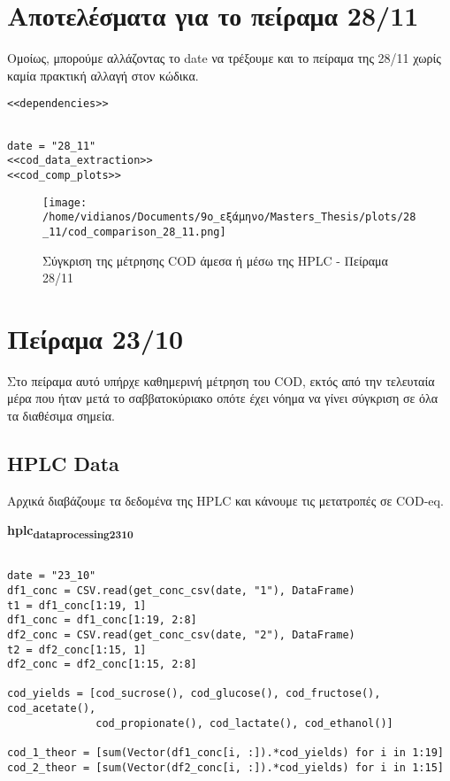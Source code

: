 \documentclass[11pt]{article}
\begin{document}
\section{Αποτελέσματα για το πείραμα 28/11}
\label{sec:org9fa10d9}
Ομοίως, μπορούμε αλλάζοντας το date να τρέξουμε και το πείραμα της 28/11 χωρίς καμία πρακτική αλλαγή στον κώδικα.

\begin{verbatim}
<<dependencies>>
\end{verbatim}

\begin{verbatim}

date = "28_11"
<<cod_data_extraction>>
<<cod_comp_plots>>

\end{verbatim}

\begin{figure}[htbp]
\centering
\texttt{[image: /home/vidianos/Documents/9o\_εξάμηνο/Masters\_Thesis/plots/28\_11/cod\_comparison\_28\_11.png]}
\caption{Σύγκριση της μέτρησης COD άμεσα ή μέσω της HPLC - Πείραμα 28/11}
\end{figure}

\section{Πείραμα 23/10}
\label{sec:orge1a3844}
Στο πείραμα αυτό υπήρχε καθημερινή μέτρηση του COD, εκτός από την τελευταία μέρα που ήταν μετά το σαββατοκύριακο οπότε έχει νόημα να γίνει σύγκριση σε όλα τα διαθέσιμα σημεία.

\subsection{HPLC Data}
\label{sec:orgcd6d45e}
Αρχικά διαβάζουμε τα δεδομένα της HPLC και κάνουμε τις μετατροπές σε COD-eq.

\textbf{hplc\textsubscript{data}\textsubscript{processing}\textsubscript{23}\textsubscript{10}}
\begin{verbatim}

date = "23_10"
df1_conc = CSV.read(get_conc_csv(date, "1"), DataFrame)
t1 = df1_conc[1:19, 1]
df1_conc = df1_conc[1:19, 2:8]
df2_conc = CSV.read(get_conc_csv(date, "2"), DataFrame)
t2 = df2_conc[1:15, 1]
df2_conc = df2_conc[1:15, 2:8]

cod_yields = [cod_sucrose(), cod_glucose(), cod_fructose(), cod_acetate(),
              cod_propionate(), cod_lactate(), cod_ethanol()]

cod_1_theor = [sum(Vector(df1_conc[i, :]).*cod_yields) for i in 1:19]
cod_2_theor = [sum(Vector(df2_conc[i, :]).*cod_yields) for i in 1:15]

\end{verbatim}
\end{document}
